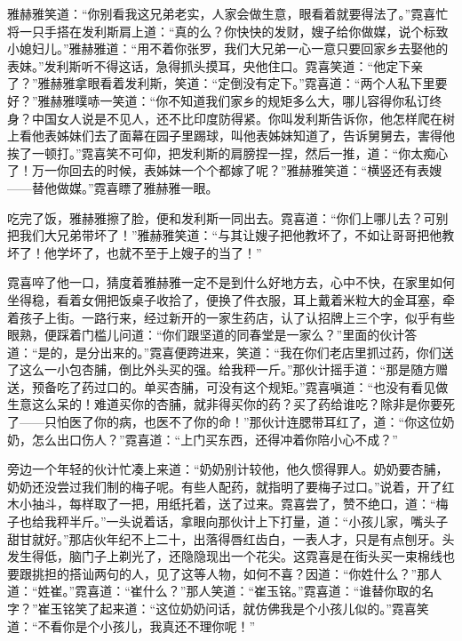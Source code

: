 \par 雅赫雅笑道：“你别看我这兄弟老实，人家会做生意，眼看着就要得法了。”霓喜忙将一只手搭在发利斯肩上道：“真的么？你快快的发财，嫂子给你做媒，说个标致小媳妇儿。”雅赫雅道：“用不着你张罗，我们大兄弟一心一意只要回家乡去娶他的表妹。”发利斯听不得这话，急得抓头摸耳，央他住口。霓喜笑道：“他定下亲了？”雅赫雅拿眼看着发利斯，笑道：“定倒没有定下。”霓喜道：“两个人私下里要好？”雅赫雅噗哧一笑道：“你不知道我们家乡的规矩多么大，哪儿容得你私订终身？中国女人说是不见人，还不比印度防得紧。你叫发利斯告诉你，他怎样爬在树上看他表姊妹们去了面幕在园子里踢球，叫他表姊妹知道了，告诉舅舅去，害得他挨了一顿打。”霓喜笑不可仰，把发利斯的肩膀捏一捏，然后一推，道：“你太痴心了！万一你回去的时候，表姊妹一个个都嫁了呢？”雅赫雅笑道：“横竖还有表嫂——替他做媒。”霓喜瞟了雅赫雅一眼。
\par 吃完了饭，雅赫雅擦了脸，便和发利斯一同出去。霓喜道：“你们上哪儿去？可别把我们大兄弟带坏了！”雅赫雅笑道：“与其让嫂子把他教坏了，不如让哥哥把他教坏了！他学坏了，也就不至于上嫂子的当了！”
\par 霓喜啐了他一口，猜度着雅赫雅一定不是到什么好地方去，心中不快，在家里如何坐得稳，看着女佣把饭桌子收拾了，便换了件衣服，耳上戴着米粒大的金耳塞，牵着孩子上街。一路行来，经过新开的一家生药店，认了认招牌上三个字，似乎有些眼熟，便踩着门槛儿问道：“你们跟坚道的同春堂是一家么？”里面的伙计答道：“是的，是分出来的。”霓喜便跨进来，笑道：“我在你们老店里抓过药，你们送了这么一小包杏脯，倒比外头买的强。给我秤一斤。”那伙计摇手道：“那是随方赠送，预备吃了药过口的。单买杏脯，可没有这个规矩。”霓喜嗔道：“也没有看见做生意这么呆的！难道买你的杏脯，就非得买你的药？买了药给谁吃？除非是你要死了——只怕医了你的病，也医不了你的命！”那伙计连腮带耳红了，道：“你这位奶奶，怎么出口伤人？”霓喜道：“上门买东西，还得冲着你陪小心不成？”
\par 旁边一个年轻的伙计忙凑上来道：“奶奶别计较他，他久惯得罪人。奶奶要杏脯，奶奶还没尝过我们制的梅子呢。有些人配药，就指明了要梅子过口。”说着，开了红木小抽斗，每样取了一把，用纸托着，送了过来。霓喜尝了，赞不绝口，道：“梅子也给我秤半斤。”一头说着话，拿眼向那伙计上下打量，道：“小孩儿家，嘴头子甜甘就好。”那店伙年纪不上二十，出落得唇红齿白，一表人才，只是有点刨牙。头发生得低，脑门子上剃光了，还隐隐现出一个花尖。这霓喜是在街头买一束棉线也要跟挑担的搭讪两句的人，见了这等人物，如何不喜？因道：“你姓什么？”那人道：“姓崔。”霓喜道：“崔什么？”那人笑道：“崔玉铭。”霓喜道：“谁替你取的名字？”崔玉铭笑了起来道：“这位奶奶问话，就仿佛我是个小孩儿似的。”霓喜笑道：“不看你是个小孩儿，我真还不理你呢！”
